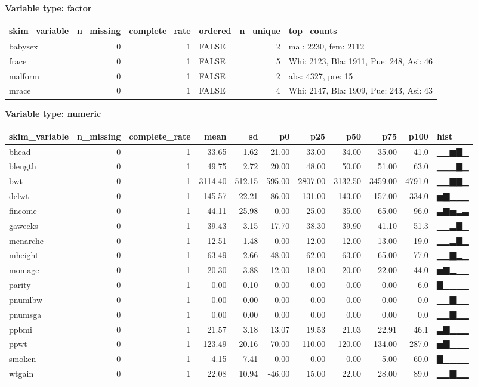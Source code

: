 \documentclass[
]{article}
\begin{document}
\textbf{Variable type: factor}

\begin{longtable}[]{@{}lrrlrl@{}}
\toprule
skim\_variable & n\_missing & complete\_rate & ordered & n\_unique &
top\_counts \\
\midrule
\endhead
babysex & 0 & 1 & FALSE & 2 & mal: 2230, fem: 2112 \\
frace & 0 & 1 & FALSE & 5 & Whi: 2123, Bla: 1911, Pue: 248, Asi: 46 \\
malform & 0 & 1 & FALSE & 2 & abs: 4327, pre: 15 \\
mrace & 0 & 1 & FALSE & 4 & Whi: 2147, Bla: 1909, Pue: 243, Asi: 43 \\
\bottomrule
\end{longtable}

\textbf{Variable type: numeric}

\begin{longtable}[]{@{}lrrrrrrrrrl@{}}
\toprule
skim\_variable & n\_missing & complete\_rate & mean & sd & p0 & p25 &
p50 & p75 & p100 & hist \\
\midrule
\endhead
bhead & 0 & 1 & 33.65 & 1.62 & 21.00 & 33.00 & 34.00 & 35.00 & 41.0 &
▁▁▆▇▁ \\
blength & 0 & 1 & 49.75 & 2.72 & 20.00 & 48.00 & 50.00 & 51.00 & 63.0 &
▁▁▁▇▁ \\
bwt & 0 & 1 & 3114.40 & 512.15 & 595.00 & 2807.00 & 3132.50 & 3459.00 &
4791.0 & ▁▁▇▇▁ \\
delwt & 0 & 1 & 145.57 & 22.21 & 86.00 & 131.00 & 143.00 & 157.00 &
334.0 & ▅▇▁▁▁ \\
fincome & 0 & 1 & 44.11 & 25.98 & 0.00 & 25.00 & 35.00 & 65.00 & 96.0 &
▃▇▅▂▃ \\
gaweeks & 0 & 1 & 39.43 & 3.15 & 17.70 & 38.30 & 39.90 & 41.10 & 51.3 &
▁▁▂▇▁ \\
menarche & 0 & 1 & 12.51 & 1.48 & 0.00 & 12.00 & 12.00 & 13.00 & 19.0 &
▁▁▂▇▁ \\
mheight & 0 & 1 & 63.49 & 2.66 & 48.00 & 62.00 & 63.00 & 65.00 & 77.0 &
▁▁▇▂▁ \\
momage & 0 & 1 & 20.30 & 3.88 & 12.00 & 18.00 & 20.00 & 22.00 & 44.0 &
▅▇▂▁▁ \\
parity & 0 & 1 & 0.00 & 0.10 & 0.00 & 0.00 & 0.00 & 0.00 & 6.0 &
▇▁▁▁▁ \\
pnumlbw & 0 & 1 & 0.00 & 0.00 & 0.00 & 0.00 & 0.00 & 0.00 & 0.0 &
▁▁▇▁▁ \\
pnumsga & 0 & 1 & 0.00 & 0.00 & 0.00 & 0.00 & 0.00 & 0.00 & 0.0 &
▁▁▇▁▁ \\
ppbmi & 0 & 1 & 21.57 & 3.18 & 13.07 & 19.53 & 21.03 & 22.91 & 46.1 &
▃▇▁▁▁ \\
ppwt & 0 & 1 & 123.49 & 20.16 & 70.00 & 110.00 & 120.00 & 134.00 & 287.0
& ▅▇▁▁▁ \\
smoken & 0 & 1 & 4.15 & 7.41 & 0.00 & 0.00 & 0.00 & 5.00 & 60.0 &
▇▁▁▁▁ \\
wtgain & 0 & 1 & 22.08 & 10.94 & -46.00 & 15.00 & 22.00 & 28.00 & 89.0 &
▁▁▇▁▁ \\
\bottomrule
\end{longtable}
\end{document}
